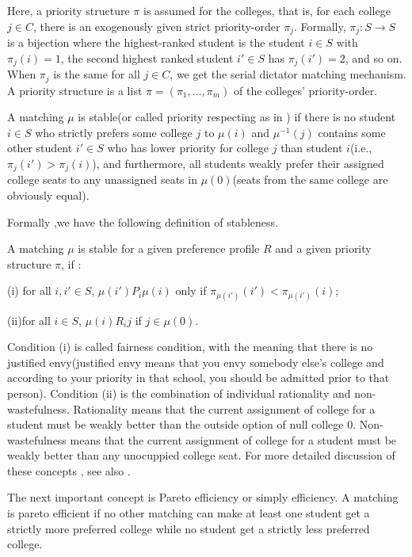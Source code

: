 Here, a priority structure $\pi$ is assumed for the colleges, that is, for each college $j \in C$, there is an exogenously given strict priority-order $\pi_j$. Formally, $\pi_j: S \rightarrow S$ is a bijection where the highest-ranked student  is the student $i\in S$ with $\pi_j(i)=1$, the second highest ranked student $i' \in S$ has $\pi_j(i')=2$, and so on. When $\pi_j$ is the same for all $j\in C$, we get the serial dictator matching mechanism. A priority structure is a list $ \pi = (\pi_1,...,\pi_m)$ of the colleges' priority-order.

 A matching $\mu$ is stable(or called priority respecting as in \parencite{Svensson2014}) if there is no student $i \in S$ who strictly prefers some college $j$ to $\mu(i)$ and $\mu^{-1}(j)$ contains some other student $i' \in S$ who has lower priority for college $j$ than student $i$(i.e., $\pi_j(i')>\pi_j(i)$), and furthermore, all students weakly prefer their assigned college seats to any unassigned seats in $\mu(0)$(seats from the same college are obviously equal). 

 Formally ,we have the following definition of stableness.

\begin{definition}
A matching $\mu$ is stable for a given preference profile $R$ and a given priority structure $\pi$, if :

(i) for all $i,i' \in S$, $\mu(i')P_i \mu(i)$ only if $\pi_{\mu(i')}(i') < \pi_{\mu(i')}(i)$;

(ii)for all $i \in S$, $\mu(i)R_i j$ if $j \in \mu(0)$.

\end{definition}

Condition (i) is called fairness condition, with the meaning that
there is no justified envy(justified envy means that you envy somebody
else's college and according to your priority in that school, you
should be admitted prior to that person). Condition (ii) is the combination of
individual rationality and non-wastefulness. Rationality means that
the current assignment of college for a student must be weakly better than the outside
option of null college 0. Non-wastefulness means that the current
assignment of college for a student  must be weakly better than any
unocuppied college seat. For more detailed discussion of these concepts
, see also \parencite{Sonmez1999}. 

The next important concept is Pareto efficiency or simply
efficiency. A matching is pareto efficient if no other matching can
make at least one student get a strictly more preferred college while
no student get a strictly less preferred college. 

